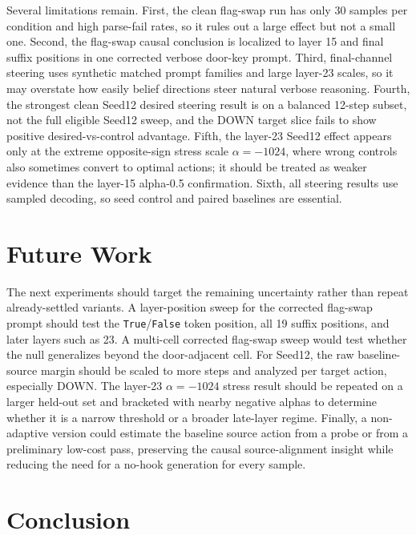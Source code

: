 \documentclass[11pt]{article}
\begin{document}
Several limitations remain.
First, the clean flag-swap run has only 30 samples per condition and high parse-fail rates, so it rules out a large effect but not a small one.
Second, the flag-swap causal conclusion is localized to layer 15 and final suffix positions in one corrected verbose door-key prompt.
Third, final-channel steering uses synthetic matched prompt families and large layer-23 scales, so it may overstate how easily belief directions steer natural verbose reasoning.
Fourth, the strongest clean Seed12 desired steering result is on a balanced 12-step subset, not the full eligible Seed12 sweep, and the DOWN target slice fails to show positive desired-vs-control advantage.
Fifth, the layer-23 Seed12 effect appears only at the extreme opposite-sign stress scale $\alpha=-1024$, where wrong controls also sometimes convert to optimal actions; it should be treated as weaker evidence than the layer-15 alpha-0.5 confirmation.
Sixth, all steering results use sampled decoding, so seed control and paired baselines are essential.

\section{Future Work}

The next experiments should target the remaining uncertainty rather than repeat already-settled variants.
A layer-position sweep for the corrected flag-swap prompt should test the \texttt{True}/\texttt{False} token position, all 19 suffix positions, and later layers such as 23.
A multi-cell corrected flag-swap sweep would test whether the null generalizes beyond the door-adjacent cell.
For Seed12, the raw baseline-source margin should be scaled to more steps and analyzed per target action, especially DOWN.
The layer-23 $\alpha=-1024$ stress result should be repeated on a larger held-out set and bracketed with nearby negative alphas to determine whether it is a narrow threshold or a broader late-layer regime.
Finally, a non-adaptive version could estimate the baseline source action from a probe or from a preliminary low-cost pass, preserving the causal source-alignment insight while reducing the need for a no-hook generation for every sample.

\section{Conclusion}
\end{document}

